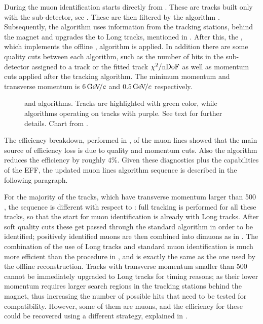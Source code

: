 During \runone the muon identification starts directly from \veloTracks. These are tracks built only with
the \velo sub-detector, see . These \veloTracks are then filtered by the \mvm algorithm
\cite{LHCb-PUB-2011-017}. Subsequently, the \FwD algorithm uses information from the tracking stations, behind
the magnet and upgrades the \veloTracks to Long tracks, mentioned in . After this, the
\isMuon, which implements the offline \muonID, algorithm is applied. In addition there are some quality cuts
between each algorithm, such as the number of hits in the \velo sub-detector assigned to a track or the fitted
track $\chi^2/\rm nDoF$ as well as momentum cuts applied after the \FwD tracking algorithm. The minimum momentum
and transverse momentum is $6 {\mathrm{\,Ge\kern -0.1em V\!/}c}$ and $0.5 {\mathrm{\,Ge\kern -0.1em V\!/}c}$ respectively.

\begin{figure}[t]
  \centering
  \scalebox{0.97}{}
  \scalebox{0.97}{}
 \caption{\runone and \runtwo \hltone algorithms. Tracks are highlighted with green color, while algorithms
           operating on tracks with purple. See text for further details. Chart from \cite{kevinThesis}.}
  \label{hlt1_algo_seq}
\end{figure}

The efficiency breakdown, performed in \cite{kevinThesis}, of the \runone \hltone muon lines showed that the
main source of efficiency loss is due to quality and momentum cuts. Also the \mvm algorithm reduces the
efficiency by roughly $4\%$. Given these diagnostics plus the \runtwo capabilities of the EFF, the updated
\hltone muon lines algorithm sequence is described in the following paragraph.

For the majority of the tracks, which have transverse momentum larger than 500 \mevc, the sequence is different with respect to
\runone: full tracking is performed for all these tracks, so that the start for muon identification is already with Long tracks.
After soft quality cuts these get passed through the standard \isMuon algorithm in order to be identified;
positively identified muons are then combined into dimuons as in \runone.
The combination of the use of Long tracks and standard muon identification is much more efficient than the
procedure in \runone, and is exactly the same as the one used by the offline reconstruction.
Tracks with transverse momentum smaller than 500 \mevc cannot be immediately upgraded to Long tracks
for timing reasons; as their lower momentum requires larger search regions in the tracking stations
behind the magnet, thus increasing the number of possible hits that need to be tested for compatibility.
However, some of them are muons, and the efficiency for these could be recovered using a different strategy,
explained in .
